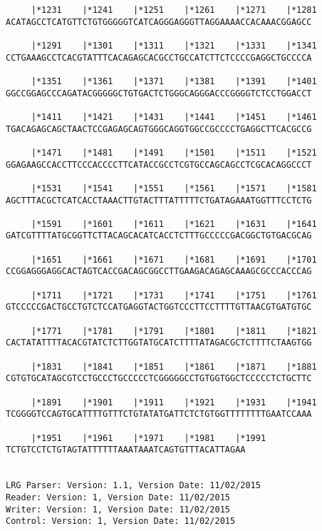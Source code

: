 \documentclass{article}
\begin{document}
\begin{Verbatim}
     |*1231    |*1241    |*1251    |*1261    |*1271    |*1281
ACATAGCCTCATGTTCTGTGGGGGTCATCAGGGAGGGTTAGGAAAACCACAAACGGAGCC
                                                            
     |*1291    |*1301    |*1311    |*1321    |*1331    |*1341
CCTGAAAGCCTCACGTATTTCACAGAGCACGCCTGCCATCTTCTCCCCGAGGCTGCCCCA
                                                            
     |*1351    |*1361    |*1371    |*1381    |*1391    |*1401
GGCCGGAGCCCAGATACGGGGGCTGTGACTCTGGGCAGGGACCCGGGGTCTCCTGGACCT
                                                            
     |*1411    |*1421    |*1431    |*1441    |*1451    |*1461
TGACAGAGCAGCTAACTCCGAGAGCAGTGGGCAGGTGGCCGCCCCTGAGGCTTCACGCCG
                                                            
     |*1471    |*1481    |*1491    |*1501    |*1511    |*1521
GGAGAAGCCACCTTCCCACCCCTTCATACCGCCTCGTGCCAGCAGCCTCGCACAGGCCCT
                                                            
     |*1531    |*1541    |*1551    |*1561    |*1571    |*1581
AGCTTTACGCTCATCACCTAAACTTGTACTTTATTTTTCTGATAGAAATGGTTTCCTCTG
                                                            
     |*1591    |*1601    |*1611    |*1621    |*1631    |*1641
GATCGTTTTATGCGGTTCTTACAGCACATCACCTCTTTGCCCCCGACGGCTGTGACGCAG
                                                            
     |*1651    |*1661    |*1671    |*1681    |*1691    |*1701
CCGGAGGGAGGCACTAGTCACCGACAGCGGCCTTGAAGACAGAGCAAAGCGCCCACCCAG
                                                            
     |*1711    |*1721    |*1731    |*1741    |*1751    |*1761
GTCCCCCGACTGCCTGTCTCCATGAGGTACTGGTCCCTTCCTTTTGTTAACGTGATGTGC
                                                            
     |*1771    |*1781    |*1791    |*1801    |*1811    |*1821
CACTATATTTTACACGTATCTCTTGGTATGCATCTTTTATAGACGCTCTTTTCTAAGTGG
                                                            
     |*1831    |*1841    |*1851    |*1861    |*1871    |*1881
CGTGTGCATAGCGTCCTGCCCTGCCCCCTCGGGGGCCTGTGGTGGCTCCCCCTCTGCTTC
                                                            
     |*1891    |*1901    |*1911    |*1921    |*1931    |*1941
TCGGGGTCCAGTGCATTTTGTTTCTGTATATGATTCTCTGTGGTTTTTTTTGAATCCAAA
                                                            
     |*1951    |*1961    |*1971    |*1981    |*1991
TCTGTCCTCTGTAGTATTTTTTAAATAAATCAGTGTTTACATTAGAA

                                               
LRG Parser: Version: 1.1, Version Date: 11/02/2015
Reader: Version: 1, Version Date: 11/02/2015
Writer: Version: 1, Version Date: 11/02/2015
Control: Version: 1, Version Date: 11/02/2015
\end{Verbatim}
\end{document}
